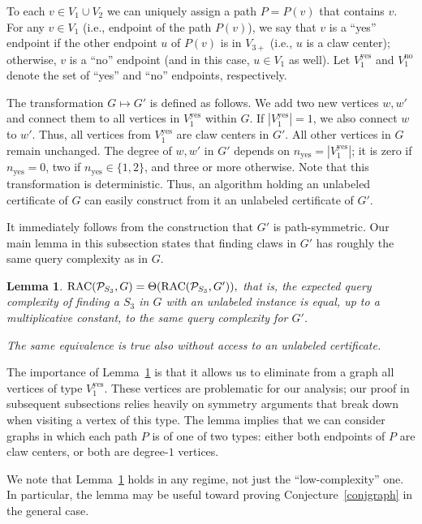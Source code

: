 \documentclass[11pt]{article}
\numberwithin{equation}{section}
\newtheorem{lemma}[lemma]{Lemma}
\renewcommand{\P}{\mathcal{P}}
\newcommand{\1}{\mathbf{1}}
\begin{document}
To each $v \in V_1 \cup V_2$ we can uniquely assign a path $P = P(v)$ that contains $v$.
For any $v \in V_1$ (i.e., endpoint of the path $P(v)$), we say that $v$ is a ``yes'' endpoint if the other endpoint $u$ of $P(v)$ is in $V_{3+}$ (i.e., $u$ is a claw center); otherwise, $v$ is a 
``no'' endpoint (and in this case, $u \in V_1$ as well). Let $V_1^{\text{yes}}$ and $V_1^{\text{no}}$ denote the set of ``yes'' and ``no'' endpoints, respectively.

The transformation $G \mapsto G'$ is defined as follows. We add two new vertices $w,w'$ and connect them to all vertices in $V_1^{\text{yes}}$ within $G$. If $|V_1^{\text{yes}}| = 1$, we also connect $w$ to $w'$.
Thus, all vertices from $V_1^{\text{yes}}$ are claw centers in $G'$.
All other vertices in $G$ remain unchanged. The degree of $w,w'$ in $G'$ depends on $n_{\text{yes}} = |V_1^{\text{yes}}|$; it is zero if $n_{\text{yes}} = 0$, two if $n_{\text{yes}} \in \{1,2\}$, and three or more otherwise.
Note that this transformation is deterministic. Thus, an algorithm holding an unlabeled certificate of $G$ can easily construct from it an unlabeled certificate of $G'$.

It immediately follows from the construction that $G'$ is path-symmetric. Our main lemma in this subsection states that finding claws in $G'$ has roughly the same query complexity as in $G$. 
\begin{lemma}
\label{lem:cleaning_up_graph_stars}
$
\RACC(\P_{S_3}, G) = \Theta(\RACC(\P_{S_3}, G')),
$
that is, the expected query complexity of finding a $S_3$ in $G$ with an unlabeled instance is equal, up to a multiplicative constant, to the same query complexity for $G'$.

The same equivalence is true also without access to an unlabeled certificate.
\end{lemma}

The importance of Lemma~\ref{lem:cleaning_up_graph_stars} is that it allows us to eliminate from a graph all vertices of type $V_1^{\text{yes}}$. These vertices are problematic for our analysis; our proof in subsequent subsections relies heavily on symmetry arguments that break down when visiting a vertex of this type. The lemma implies that we can consider graphs in which each path $P$ is of one of two types: either both endpoints of $P$ are claw centers, or both are degree-$1$ vertices.

We note that Lemma~\ref{lem:cleaning_up_graph_stars} holds in any regime, not just the ``low-complexity'' one. In particular, the lemma may be useful toward proving Conjecture~\ref{conjgraph} in the general case.
\end{document}

